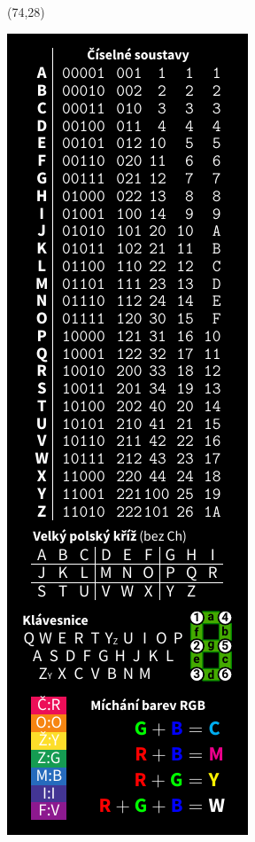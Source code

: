 \documentclass{extarticle}
\begin{document}
\begin{textblock}{42}(74,28)
\vfill
{\centerline{\includegraphics[scale=1,]{tools-back.pdf}}} 
\vfill
\end{textblock}
\end{document}
